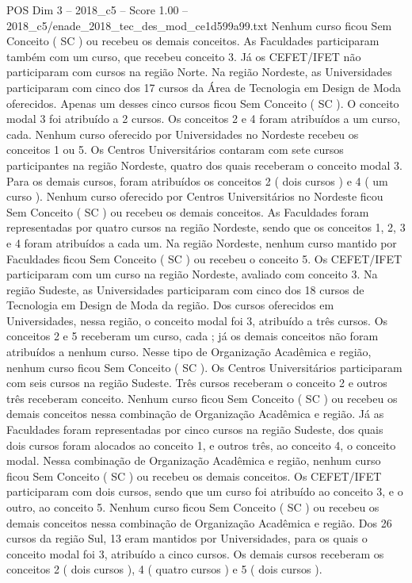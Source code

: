 \begin{textsample}{POS Dim 3 – 2018\_c5 – Score 1.00 – 2018\_c5/enade\_2018\_tec\_des\_mod\_ce1d599a99.txt}
Nenhum curso ficou Sem Conceito ( SC ) ou recebeu os demais conceitos.
As Faculdades participaram também com um curso, que recebeu conceito 3.
Já os CEFET/IFET não participaram com cursos na região Norte.
Na região Nordeste, as Universidades participaram com cinco dos 17 cursos da Área de Tecnologia em Design de Moda oferecidos.
Apenas um desses cinco cursos ficou Sem Conceito ( SC ).
O conceito modal 3 foi atribuído a 2 cursos.
Os conceitos 2 e 4 foram atribuídos a um curso, cada.
Nenhum curso oferecido por Universidades no Nordeste recebeu os conceitos 1 ou 5.
Os Centros Universitários contaram com sete cursos participantes na região Nordeste, quatro dos quais receberam o conceito modal 3.
Para os demais cursos, foram atribuídos os conceitos 2 ( dois cursos ) e 4 ( um curso ).
Nenhum curso oferecido por Centros Universitários no Nordeste ficou Sem Conceito ( SC ) ou recebeu os demais conceitos.
As Faculdades foram representadas por quatro cursos na região Nordeste, sendo que os conceitos 1, 2, 3 e 4 foram atribuídos a cada um.
Na região Nordeste, nenhum curso mantido por Faculdades ficou Sem Conceito ( SC ) ou recebeu o conceito 5.
Os CEFET/IFET participaram com um curso na região Nordeste, avaliado com conceito 3.
Na região Sudeste, as Universidades participaram com cinco dos 18 cursos de Tecnologia em Design de Moda da região.
Dos cursos oferecidos em Universidades, nessa região, o conceito modal foi 3, atribuído a três cursos.
Os conceitos 2 e 5 receberam um curso, cada ; já os demais conceitos não foram atribuídos a nenhum curso.
Nesse tipo de Organização Acadêmica e região, nenhum curso ficou Sem Conceito ( SC ).
Os Centros Universitários participaram com seis cursos na região Sudeste.
Três cursos receberam o conceito 2 e outros três receberam conceito.
Nenhum curso ficou Sem Conceito ( SC ) ou recebeu os demais conceitos nessa combinação de Organização Acadêmica e região.
Já as Faculdades foram representadas por cinco cursos na região Sudeste, dos quais dois cursos foram alocados ao conceito 1, e outros três, ao conceito 4, o conceito modal.
Nessa combinação de Organização Acadêmica e região, nenhum curso ficou Sem Conceito ( SC ) ou recebeu os demais conceitos.
Os CEFET/IFET participaram com dois cursos, sendo que um curso foi atribuído ao conceito 3, e o outro, ao conceito 5.
Nenhum curso ficou Sem Conceito ( SC ) ou recebeu os demais conceitos nessa combinação de Organização Acadêmica e região.
Dos 26 cursos da região Sul, 13 eram mantidos por Universidades, para os quais o conceito modal foi 3, atribuído a cinco cursos.
Os demais cursos receberam os conceitos 2 ( dois cursos ), 4 ( quatro cursos ) e 5 ( dois cursos ).

\end{textsample}
